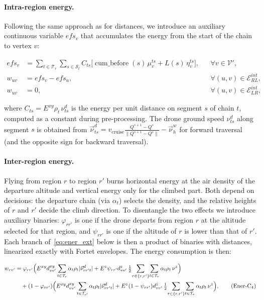 \documentclass[12pt]{elsarticle}
\begin{document}
\paragraph{Intra-region energy.}
Following the same approach as for distances, we introduce an auxiliary continuous variable $efs_v$ that accumulates the energy from the start of the chain to vertex $v$:

\begin{align}
    efs_v &= \sum_{t\in\mathcal T_r}\sum_{s\in\mathcal S_t}
            C_{ts}\bigl[ \operatorname{cum\_before}(s)\,\mu_v^{ts}
            + L(s)\,\eta_v^{ts} \bigr],
            && \forall v\in\mathcal V',
            \label{eq:efs}\tag{Ener-C$_1$}\\[2mm]
    w_{uv} &= efs_v - efs_u,
            && \forall (u,v)\in\mathcal E_{RL}^{int},
            \label{eq:ener_int_rl}\tag{Ener-C$_2$}\\
    w_{uv} &= 0,
            && \forall (u,v)\in\mathcal E_{LR}^{int},
            \label{eq:ener_int_lr}\tag{Ener-C$_3$}
\end{align}

\noindent where $C_{ts}=E^{xy}\rho_t\,\nu_{ts}^d$ is the energy per unit distance on segment $s$ of chain $t$, computed as a constant during pre-processing. The drone ground speed $\nu_{ts}^d$ along segment $s$ is obtained from $\vec\nu_{ts}^d = v_{\text{cruise}}\frac{Q^{s+1}-Q^s}{\|Q^{s+1}-Q^s\|} - \vec\nu_{h}^w$ for forward traversal (and the opposite sign for backward traversal).

\paragraph{Inter-region energy.}
Flying from region $r$ to region $r'$ burns horizontal energy at the air density of the departure altitude and vertical energy only for the climbed part. Both depend on decisions: the departure chain (via $\alpha_t$) selects the density, and the relative heights of $r$ and $r'$ decide the climb direction. To disentangle the two effects we introduce auxiliary binaries: $\varphi_{rr'}$ is one if the drone departs from region $r$ at the altitude selected for that region, and $\psi_{rr'}$ is one if the altitude of $r$ is lower than that of $r'$. Each branch of~\eqref{eq:ener_ext} below is then a product of binaries with distances, linearized exactly with Fortet envelopes. The energy consumption is then:

\begin{align}
    w_{vv'} &=
    \varphi_{rr'}\Bigl( E^{xy}d_{vv'}^{xy}\sum_{t\in\mathcal T_r}\alpha_t\rho_t|\vec\nu_{rr't}^{d}|
    + E^{z}\psi_{rr'}d_{vv'}^{z}\,\tfrac12\!\sum_{\tau\in\{r,r'\}}\!\sum_{t\in\mathcal T_\tau}\alpha_t\rho_t\,\nu^{z}\Bigr) \nonumber\\
    &\quad + (1-\varphi_{rr'})\Bigl( E^{xy}d_{vv'}^{xy}\sum_{t\in\mathcal T_{r'}}\alpha_t\rho_t|\vec\nu_{rr't}^{d}|
    + E^{z}(1-\psi_{rr'})d_{vv'}^{z}\,\tfrac12\!\sum_{\tau\in\{r,r'\}}\!\sum_{t\in\mathcal T_\tau}\alpha_t\rho_t\,\nu^{z}\Bigr),
    \label{eq:ener_ext}\tag{Ener-C$_4$}
\end{align}
\end{document}
